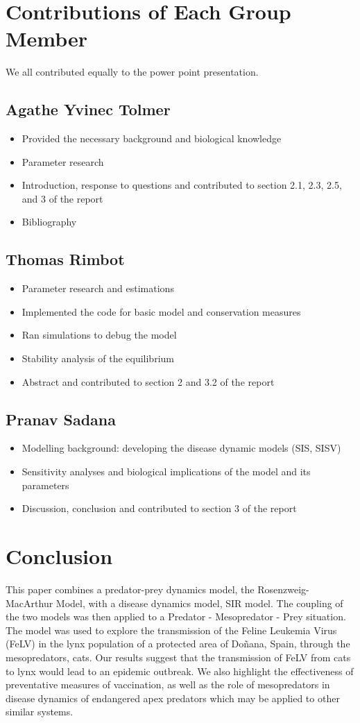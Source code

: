 \documentclass[12pt]{article}
\begin{document}
\section{Contributions of Each Group Member}
\quad We all contributed equally to the power point presentation.

\subsection{Agathe Yvinec Tolmer}
\begin{itemize}
    \item Provided the necessary background and biological knowledge
    \item Parameter research
    \item Introduction, response to questions and contributed to section 2.1, 2.3, 2.5, and 3 of the report
    \item Bibliography
\end{itemize}
\subsection{Thomas Rimbot}
\begin{itemize}
    \item Parameter research and estimations
    \item Implemented the code for basic model and conservation measures
    \item Ran simulations to debug the model
    \item Stability analysis of the equilibrium
    \item Abstract and contributed to section 2 and 3.2 of the report
\end{itemize}
\subsection{Pranav Sadana}
\begin{itemize}
    \item Modelling background: developing the disease dynamic models (SIS, SISV)
    \item Sensitivity analyses and biological implications of the model and its parameters
    \item Discussion, conclusion and contributed to section 3 of the report
\end{itemize}
\section{Conclusion}
\quad This paper combines a predator-prey dynamics model, the Rosenzweig-MacArthur Model, with a disease dynamics model, SIR model. The coupling of the two models was then applied to a Predator - Mesopredator - Prey situation.  The model was used to explore the transmission of the Feline Leukemia Virus (FeLV) in the lynx population of a protected area of Doñana, Spain, through the mesopredators, cats. Our results suggest that the transmission of FeLV from cats to lynx would lead to an epidemic outbreak. We also highlight the effectiveness of preventative measures of vaccination, as well as the role of mesopredators in disease dynamics of endangered apex predators which may be applied to other similar systems.

\vfill\eject
\printbibliography
\end{document}
